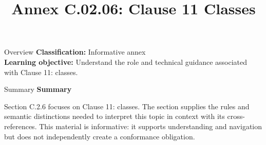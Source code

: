 \documentclass[10pt,letterpaper]{article}
\title{Annex C.02.06: Clause 11 Classes}
\author{}
\date{}
\begin{document}
\maketitle
\begin{CornellOverviewBox}{Overview}
\textbf{Classification:} Informative annex\\[2pt]
\textbf{Learning objective:} Understand the role and technical guidance associated with Clause 11: classes.
\end{CornellOverviewBox}\begin{CornellSummaryBox}{Summary}
{\sffamily\bfseries\color{Accent} Summary}\par\vspace{3pt}Section C.2.6 focuses on Clause 11: classes. The section supplies the rules and semantic distinctions needed to interpret this topic in context with its cross-references. This material is informative: it supports understanding and navigation but does not independently create a conformance obligation.
\end{CornellSummaryBox}
\end{document}
